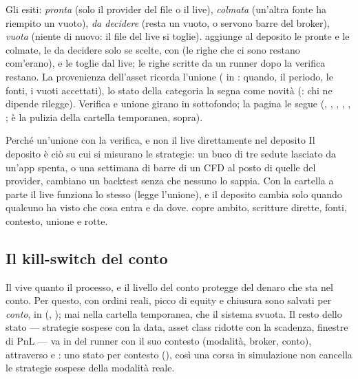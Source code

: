 \noindent
Gli esiti: \emph{pronta} (solo il provider del file o il live),
\emph{colmata} (un'altra fonte ha riempito un vuoto), \emph{da decidere}
(resta un vuoto, o servono barre del broker), \emph{vuota} (niente di nuovo:
il file del live si toglie).  aggiunge al deposito le pronte
e le colmate, le da decidere solo se scelte, con  (le righe
che ci sono restano com'erano), e le toglie dal live; le righe scritte da un
runner dopo la verifica restano. La provenienza dell'asset ricorda l'unione
( in : quando, il periodo, le fonti, i vuoti
accettati), lo stato della categoria la segna come novità
(: chi ne dipende rilegge). Verifica e unione
girano in sottofondo; la pagina le segue (,
, , , , ;
 è la pulizia della cartella temporanea, sopra).

\begin{perche}{Perché un'unione con la verifica, e non il live direttamente nel deposito}
Il deposito è ciò su cui si misurano le strategie: un buco di tre sedute
lasciato da un'app spenta, o una settimana di barre di un CFD al posto di
quelle del provider, cambiano un backtest senza che nessuno lo sappia. Con
la cartella a parte il live funziona lo stesso (legge l'unione), e il
deposito cambia solo quando qualcuno ha visto che cosa entra e da dove.
 copre ambito, scritture dirette, fonti,
contesto, unione e rotte.
\end{perche}

\subsection{Il kill-switch del conto}\label{sez:live-kill}

Il  vive quanto il processo, e il livello del conto
protegge del denaro che sta nel conto. Per questo, con ordini reali, picco
di equity e chiusura sono salvati per \emph{conto}, in
 (,
); mai nella cartella temporanea, che il
sistema svuota. Il resto dello stato --- strategie sospese con la data,
asset class ridotte con la scadenza, finestre di PnL --- va in
 del runner con il suo contesto (modalità, broker, conto),
attraverso  e : uno
stato per contesto (), così una corsa in
simulazione non cancella le strategie sospese della modalità reale.

